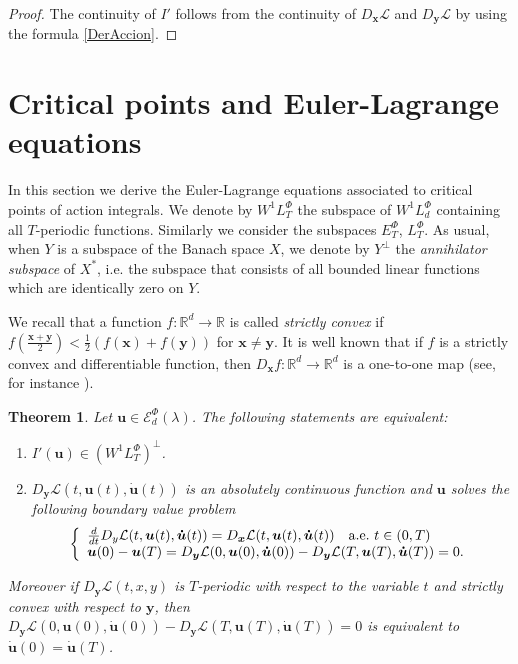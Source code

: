 \documentclass[twoside]{article}
\newtheorem{thm}{Theorem}[section]
\theoremstyle{remark}
\newcommand{\lphi}{L^{\Phi}}
\newcommand{\ephi}{E^{\Phi}}
\newcommand{\wphi}{W^{1}\lphi}
\newcommand{\domi}{\mathcal{E}^{\Phi}_d(\lambda)}
\renewcommand{\b}[1]{\boldsymbol{#1}}
\begin{document}
\begin{proof}
The continuity of $I'$  follows  from the continuity 
of $D_{\b{x}}\mathcal{L}$ and $D_{\b{y}}\mathcal{L}$ by using the formula \eqref{DerAccion}.
\end{proof}



\section{Critical points and Euler-Lagrange equations}


In this section we derive the Euler-Lagrange equations associated to critical points of action integrals.  We denote by $\wphi_T$ the subspace of $\wphi_d$ containing all \linebreak $T$-periodic functions. Similarly we consider the subspaces $\ephi_T$, $\lphi_T$. As usual, when $Y$ is a subspace of
the Banach space $X$, we denote by $Y^{\perp}$ the \emph{annihilator subspace} of $X^*$, i.e. the subspace
that consists of all  bounded linear functions which are identically zero on $Y$.

We recall that  a function $f: \mathbb{R}^d \to \mathbb{R}$ is called \emph{strictly convex} if 
\linebreak
$f\left(\tfrac{\b{x}+\b{y}}{2}\right)< \tfrac{1}{2} \left(f\left(
\b{x}\right)+f\left( \b{y}\right)\right)$ for  $\b{x}\neq\b{y}$.  It is  well known that if $f$ is a strictly convex and differentiable function, then
$D_{\b{x}}f:\mathbb{R}^d\to\mathbb{R}^d$ is a one-to-one map  (see, for instance \cite[Thm. 12.17]{rockafellar2009variational}).


\begin{thm}\label{critpoint} Let $\b{u}\in\domi$. The following statements are equivalent:
\begin{enumerate}
 \item $I'(\b{u})\in\left( \wphi_T\right)^{\perp}$.
 \item  $D_{\b{y}}\mathcal{L}(t,\b{u}(t),\b{\dot{u}}(t))$ is an absolutely continuous function and $\b{u}$ solves the following boundary value problem
 \begin{equation}\label{ecualagran2}
    \left\{%
\begin{array}{ll}
   \frac{d}{dt} D_{y}\mathcal{L}(t,\b{u}(t),\b{\dot{u}}(t))= D_{\b{x}}\mathcal{L}(t,\b{u}(t),\b{\dot{u}}(t)) \quad \hbox{a.e.}\ t \in (0,T)\\
    \b{u}(0)-\b{u}(T)=D_{\b{y}}\mathcal{L}(0,\b{u}(0),\b{\dot{u}}(0))-D_{\b{y}}\mathcal{L}(T,\b{u}(T),\b{\dot{u}}(T))=0.
\end{array}%
\right.
\end{equation}
\end{enumerate}
Moreover if $D_{\b{y}}\mathcal{L}(t,x,y)$ is $T$-periodic with respect to the variable $t$ and strictly convex with respect to $\b{y}$, then
$D_{\b{y}}\mathcal{L}(0,\b{u}(0),\b{\b{\dot{\b{u}}}}(0))-D_{\b{y}}\mathcal{L}(T,\b{u}(T),\b{\dot{u}}(T))=0$ is equivalent to $\b{\dot{u}}(0)=\b{\dot{u}}(T)$.
\end{thm}
\end{document}
